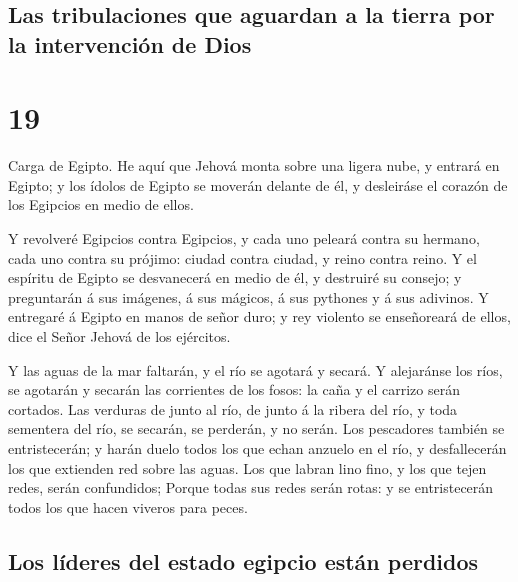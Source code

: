 \hypertarget{las-tribulaciones-que-aguardan-a-la-tierra-por-la-intervenciuxf3n-de-dios}{%
\subsection{Las tribulaciones que aguardan a la tierra por la
intervención de
Dios}\label{las-tribulaciones-que-aguardan-a-la-tierra-por-la-intervenciuxf3n-de-dios}}

\hypertarget{section-23-19}{%
\section{19}\label{section-23-19}}

 Carga de Egipto. He aquí que Jehová monta sobre una
ligera nube, y entrará en Egipto; y los ídolos de Egipto se moverán
delante de él, y desleiráse el corazón de los Egipcios en medio de
ellos.

 Y revolveré Egipcios contra Egipcios, y cada uno peleará
contra su hermano, cada uno contra su prójimo: ciudad contra ciudad, y
reino contra reino.  Y el espíritu de Egipto se
desvanecerá en medio de él, y destruiré su consejo; y preguntarán á sus
imágenes, á sus mágicos, á sus pythones y á sus adivinos. 
Y entregaré á Egipto en manos de señor duro; y rey violento se
enseñoreará de ellos, dice el Señor Jehová de los ejércitos.

 Y las aguas de la mar faltarán, y el río se agotará y
secará.  Y alejaránse los ríos, se agotarán y secarán las
corrientes de los fosos: la caña y el carrizo serán cortados.
 Las verduras de junto al río, de junto á la ribera del
río, y toda sementera del río, se secarán, se perderán, y no serán.
 Los pescadores también se entristecerán; y harán duelo
todos los que echan anzuelo en el río, y desfallecerán los que extienden
red sobre las aguas.  Los que labran lino fino, y los que
tejen redes, serán confundidos;  Porque todas sus redes
serán rotas: y se entristecerán todos los que hacen viveros para peces.

\hypertarget{los-luxedderes-del-estado-egipcio-estuxe1n-perdidos}{%
\subsection{Los líderes del estado egipcio están
perdidos}\label{los-luxedderes-del-estado-egipcio-estuxe1n-perdidos}}

